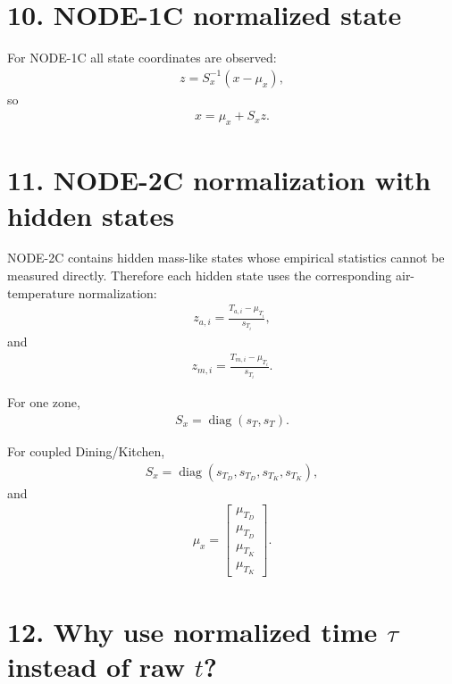 \documentclass[11pt]{article}
\begin{document}
\section*{10. NODE-1C normalized state}

For NODE-1C all state coordinates are observed:
\begin{align}
\boxed{
z=S_x^{-1}(x-\mu_x),
}
\tag{N3.19}
\end{align}
so
\begin{align}
\boxed{
x=\mu_x+S_xz.
}
\tag{N3.20}
\end{align}

\section*{11. NODE-2C normalization with hidden states}

NODE-2C contains hidden mass-like states whose empirical statistics cannot be measured directly. Therefore each hidden state uses the corresponding air-temperature normalization:
\begin{align}
\boxed{
z_{a,i}
=
\frac{T_{a,i}-\mu_{T_i}}{s_{T_i}},
}
\tag{N3.21}
\end{align}
and
\begin{align}
\boxed{
z_{m,i}
=
\frac{T_{m,i}-\mu_{T_i}}{s_{T_i}}.
}
\tag{N3.22}
\end{align}

For one zone,
\begin{align}
\boxed{
S_x=\operatorname{diag}(s_T,s_T).
}
\tag{N3.23}
\end{align}

For coupled Dining/Kitchen,
\begin{align}
\boxed{
S_x=
\operatorname{diag}
(s_{T_D},s_{T_D},s_{T_K},s_{T_K}),
}
\tag{N3.24}
\end{align}
and
\begin{align}
\boxed{
\mu_x=
\begin{bmatrix}
\mu_{T_D}\\
\mu_{T_D}\\
\mu_{T_K}\\
\mu_{T_K}
\end{bmatrix}.
}
\tag{N3.25}
\end{align}

\section*{12. Why use normalized time \(\tau\) instead of raw \(t\)?}
\end{document}
